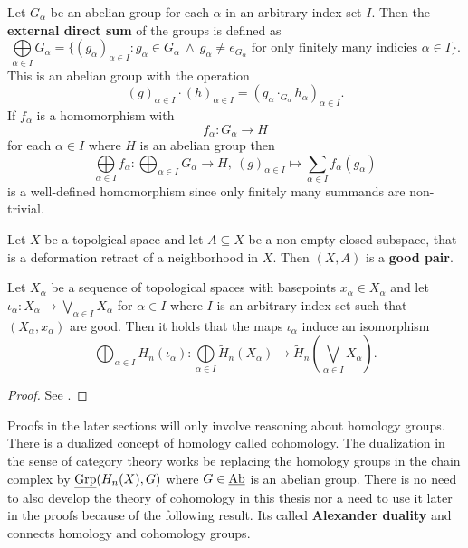 \begin{defin}
  Let $G_\alpha$ be an abelian group for each $\alpha$ in an arbitrary index set $I$. Then the \textbf{external direct sum} of the groups is defined as
  \begin{equation*}
    \bigoplus\limits_{\alpha \in I}G_\alpha = \{(g_\alpha)_{\alpha\in I}\colon g_\alpha\in G_\alpha \: \land \: g_\alpha \neq e_{G_\alpha} \text{ for only finitely many indicies } \alpha \in I\}.
  \end{equation*}
  This is an abelian group with the operation \[(g)_{\alpha \in I} \cdot (h)_{\alpha\in I} = (g_\alpha \cdot_{G_\alpha} h_\alpha)_{\alpha \in I}.\]
  If $f_\alpha$ is a homomorphism with \[f_\alpha\colon G_\alpha \to H\]  for each $\alpha \in I$ where $H$ is an abelian group then
  \begin{equation*}
    \bigoplus\limits_{\alpha\in I}f_\alpha\colon \bigoplus_{\alpha \in I} G_\alpha\to H,\: (g)_{\alpha \in I} \mapsto \sum\limits_{\alpha \in I}f_\alpha(g_\alpha)
  \end{equation*}
  is a well-defined homomorphism since only finitely many summands are non-trivial.
\end{defin}

\begin{defin}
  Let $X$ be a topolgical space and let $A \subseteq X$ be a non-empty closed subspace, that is a deformation retract of a neighborhood in $X$. Then $(X, A)$ is a \textbf{good pair}.
\end{defin}

\begin{lemma}\label{lem:holwe}
  Let $X_\alpha$ be a sequence of topological spaces with basepoints $x_\alpha\in X_\alpha$ and let $\iota_\alpha\colon X_\alpha \to \bigvee\limits_{\alpha \in I}X_\alpha$ for $\alpha \in I$ where $I$ is an arbitrary index set such that $(X_\alpha, x_\alpha)$ are good. Then it holds that the maps $\iota_\alpha$ induce an isomorphism
  \begin{equation*}
    \bigoplus_{\alpha \in I}H_n(\iota_\alpha) \colon \bigoplus\limits_{\alpha\in I} \tilde{H}_n(X_\alpha)\to \tilde{H}_n\left(\bigvee\limits_{\alpha\in I} X_\alpha\right).
  \end{equation*}
\end{lemma}

\begin{proof}
  See \cite[Corollary 2.25]{hatcher}.
\end{proof}

Proofs in the later sections will only involve reasoning about homology groups. There is a dualized concept of homology called cohomology.
The dualization in the sense of category theory works be replacing the homology groups in the chain complex by $\underline{\rm Grp}(H_n(X), G)$ where $G \in \underline{\rm Ab}$ is an abelian group. There is no need to also develop the theory of cohomology in this thesis nor a need to use it later in the proofs because of the following result. Its called \textbf{Alexander duality} and connects homology and cohomology groups.

